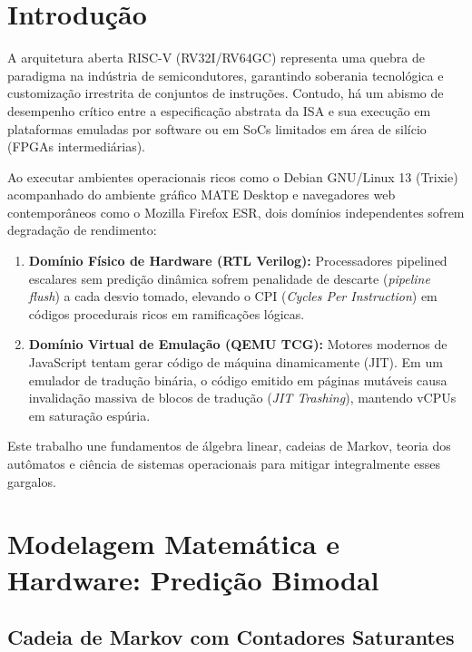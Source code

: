 \documentclass[10pt,twocolumn]{article}
\begin{document}
\section{Introdu\c{c}\~ao}

A arquitetura aberta RISC-V (RV32I/RV64GC) representa uma quebra de paradigma na ind\'ustria de semicondutores, garantindo soberania tecnol\'ogica e customiza\c{c}\~ao irrestrita de conjuntos de instru\c{c}\~oes. Contudo, h\'a um abismo de desempenho cr\'itico entre a especifica\c{c}\~ao abstrata da ISA e sua execu\c{c}\~ao em plataformas emuladas por software ou em SoCs limitados em \'area de sil\'icio (FPGAs intermedi\'arias).

Ao executar ambientes operacionais ricos como o Debian GNU/Linux 13 (Trixie) acompanhado do ambiente gr\'afico MATE Desktop e navegadores web contempor\^aneos como o Mozilla Firefox ESR, dois dom\'inios independentes sofrem degrada\c{c}\~ao de rendimento:

\begin{enumerate}
    \item \textbf{Dom\'inio F\'isico de Hardware (RTL Verilog):} Processadores pipelined escalares sem predi\c{c}\~ao din\^amica sofrem penalidade de descarte (\textit{pipeline flush}) a cada desvio tomado, elevando o CPI (\textit{Cycles Per Instruction}) em c\'odigos procedurais ricos em ramifica\c{c}\~oes l\'ogicas.
    \item \textbf{Dom\'inio Virtual de Emula\c{c}\~ao (QEMU TCG):} Motores modernos de JavaScript tentam gerar c\'odigo de m\'aquina dinamicamente (JIT). Em um emulador de tradu\c{c}\~ao bin\'aria, o c\'odigo emitido em p\'aginas mut\'aveis causa invalida\c{c}\~ao massiva de blocos de tradu\c{c}\~ao (\textit{JIT Trashing}), mantendo vCPUs em satura\c{c}\~ao esp\'uria.
\end{enumerate}

Este trabalho une fundamentos de \'algebra linear, cadeias de Markov, teoria dos aut\^omatos e ci\^encia de sistemas operacionais para mitigar integralmente esses gargalos.

\section{Modelagem Matem\'atica e Hardware: Predi\c{c}\~ao Bimodal}

\subsection{Cadeia de Markov com Contadores Saturantes}
\end{document}
